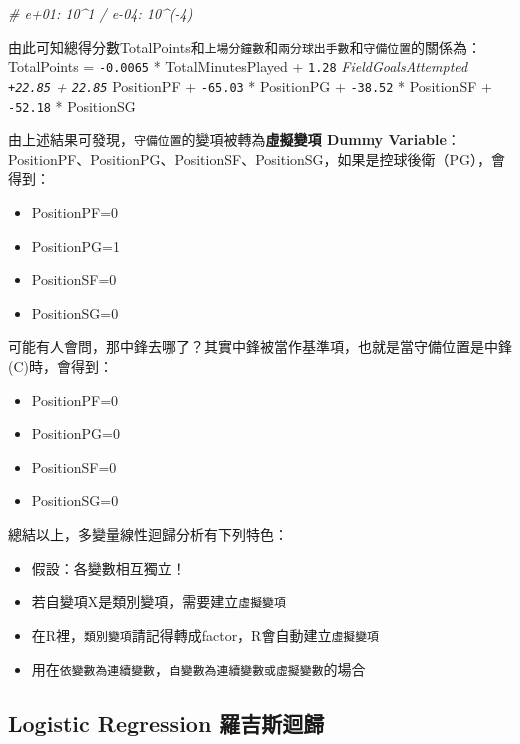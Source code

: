 \documentclass[
]{book}
\newenvironment{Shaded}{\begin{snugshade}}{\end{snugshade}}
\newcommand{\CommentTok}[1]{\textcolor[rgb]{0.56,0.35,0.01}{\textit{#1}}}
\providecommand{\tightlist}{%
  \setlength{\itemsep}{0pt}\setlength{\parskip}{0pt}}
\begin{document}
\begin{Shaded}
\begin{Highlighting}[]
\CommentTok{# e+01: 10^1 / e-04: 10^(-4)}
\end{Highlighting}
\end{Shaded}

由此可知總得分數TotalPoints和\texttt{上場分鐘數}和\texttt{兩分球出手數}和\texttt{守備位置}的關係為：
TotalPoints = \texttt{-0.0065} * TotalMinutesPlayed + \texttt{1.28} \emph{FieldGoalsAttempted \texttt{+22.85} + \texttt{22.85} } PositionPF + \texttt{-65.03} * PositionPG + \texttt{-38.52} * PositionSF + \texttt{-52.18} * PositionSG

由上述結果可發現，\texttt{守備位置}的變項被轉為\textbf{虛擬變項 Dummy Variable}：PositionPF、PositionPG、PositionSF、PositionSG，如果是控球後衛（PG），會得到：

\begin{itemize}
\tightlist
\item
  PositionPF=0
\item
  PositionPG=1
\item
  PositionSF=0
\item
  PositionSG=0
\end{itemize}

可能有人會問，那中鋒去哪了？其實中鋒被當作基準項，也就是當守備位置是中鋒(C)時，會得到：

\begin{itemize}
\tightlist
\item
  PositionPF=0
\item
  PositionPG=0
\item
  PositionSF=0
\item
  PositionSG=0
\end{itemize}

總結以上，多變量線性迴歸分析有下列特色：

\begin{itemize}
\tightlist
\item
  假設：各變數相互獨立！
\item
  若自變項X是類別變項，需要建立\texttt{虛擬變項}
\item
  在R裡，\texttt{類別變項}請記得轉成factor，R會自動建立\texttt{虛擬變項}
\item
  用在\texttt{依變數為連續變數}，\texttt{自變數為連續變數或虛擬變數}的場合
\end{itemize}

\hypertarget{logistic-regression-ux7f85ux5409ux65afux8ff4ux6b78}{%
\subsection{Logistic Regression 羅吉斯迴歸}\label{logistic-regression-ux7f85ux5409ux65afux8ff4ux6b78}}
\end{document}
